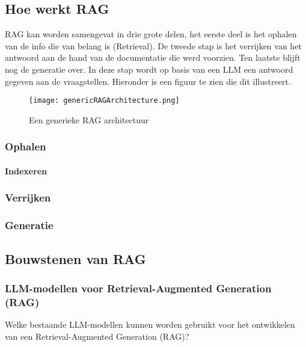     \subsection{Hoe werkt RAG}
    
    RAG kan worden samengevat in drie grote delen, het eerste deel is het ophalen van de info die van belang is (Retrieval). De tweede stap is het verrijken van het antwoord aan de hand van de documentatie die werd voorzien. Ten laatste blijft nog de generatie over. In deze stap wordt op basis van een LLM een antwoord gegeven aan de vraagstellen. Hieronder is een figuur te zien die dit illustreert.
    
     \begin{figure}[H]
        \centering
        \texttt{[image: genericRAGArchitecture.png]}
        \caption{Een generieke RAG architectuur \cite{Zhao2024}}
        \label{fig:livebench}
    \end{figure}
    
        \subsubsection{Ophalen}
            \paragraph{Indexeren}
        \subsubsection{Verrijken}
        \subsubsection{Generatie}
    
    
    \subsection{Bouwstenen van RAG}
    
    
        \subsubsection{LLM-modellen voor Retrieval-Augmented Generation (RAG)}
        Welke bestaande LLM-modellen kunnen worden gebruikt voor het ontwikkelen van een Retrieval-Augmented Generation (RAG)? 
        
        
